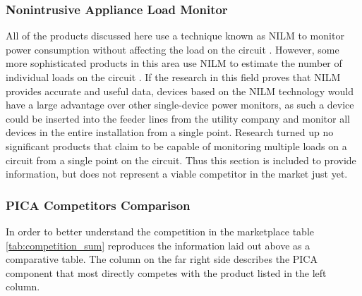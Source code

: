 \subsubsection{Nonintrusive Appliance Load Monitor} %
All of the products discussed here use a technique known as \ac{NILM} to monitor power consumption without affecting the load on the circuit \cite{NILM}. However, some more sophisticated products in this area use \ac{NILM} to estimate the number of individual loads on the circuit \cite{NALM}. If the research in this field proves that \ac{NILM} provides accurate and useful data, devices based on the \ac{NILM} technology would have a large advantage over other single-device power monitors, as such a device could be inserted into the feeder lines from the utility company and monitor all devices in the entire installation from a single point. Research turned up no significant products that claim to be capable of monitoring multiple loads on a circuit from a single point on the circuit. Thus this section is included to provide information, but does not represent a viable competitor in the market just yet.

\subsubsection{PICA Competitors Comparison} %
In order to better understand the competition in the marketplace table \ref{tab:competition_sum} reproduces the information laid out above as a comparative table. The column on the far right side describes the PICA component that most directly competes with the product listed in the left column.
